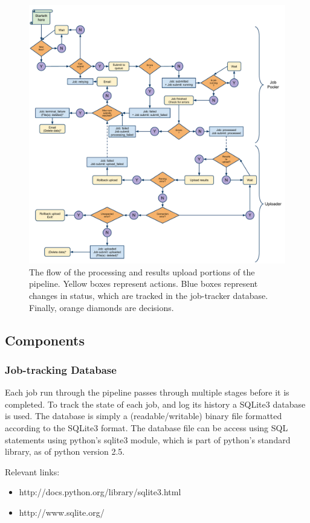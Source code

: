 \documentclass[12pt]{article}
\begin{document}
\begin{figure}
    \centering
    \includegraphics[scale=0.5]{./figs/JobFlow.pdf}
    \caption{The flow of the processing and results upload portions of the pipeline. Yellow boxes represent actions. Blue boxes represent changes in status, which are tracked in the job-tracker database. Finally, orange diamonds are decisions. \label{fig:job flow}}
\end{figure}


\subsection{Components}
\subsubsection{Job-tracking Database}
Each job run through the pipeline passes through multiple stages before it is completed. To track the state of each job, and log its history a SQLite3 database is used. The database is simply a (readable/writable) binary file formatted according to the SQLite3 format. The database file can be access using SQL statements using python's sqlite3 module, which is part of python's standard library, as of python version 2.5.

Relevant links:
\begin{itemize}
    \item http://docs.python.org/library/sqlite3.html
    \item http://www.sqlite.org/
\end{itemize}
\end{document}
